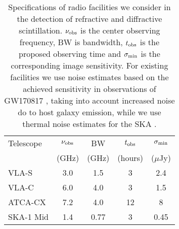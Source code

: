 \begin{table}
	\centering
	\caption[Specifications of the ATCA, VLA and SKA]{Specifications of radio facilities we consider in the detection of refractive and diffractive scintillation. $\nu_{\rm obs}$ is the center observing frequency, BW is bandwidth, $t_{\rm obs}$ is the proposed observing time and $\sigma_{\rm min}$ is the corresponding image sensitivity. For existing facilities we use noise estimates based on the achieved sensitivity in observations of GW170817 \citep[e.g.][]{2018ApJ...868L..11M}, taking into account increased noise do to host galaxy emission, while we use thermal noise estimates for the SKA \citep{2019arXiv191212699B}.}
	\label{tab:facility_specs}
	\begin{tabular}{lcccc}
    	\hline\hline
    	Telescope & $\nu_{\rm obs}$ & BW & $t_{\rm obs}$ & $\sigma_{\rm min}$\\
    	~ & (GHz) & (GHz) & (hours) & ($\mu$Jy)\\
    	\hline
    	VLA-S & 3.0 & 1.5 & 3 & 2.4\\
    	VLA-C & 6.0 & 4.0 & 3 & 1.5\\
    	ATCA-CX & 7.2 & 4.0 & 12 & 8\\
    	\hline
    	SKA-1 Mid & 1.4 & 0.77 & 3 & 0.45\\
    \hline
    \end{tabular}
\end{table}